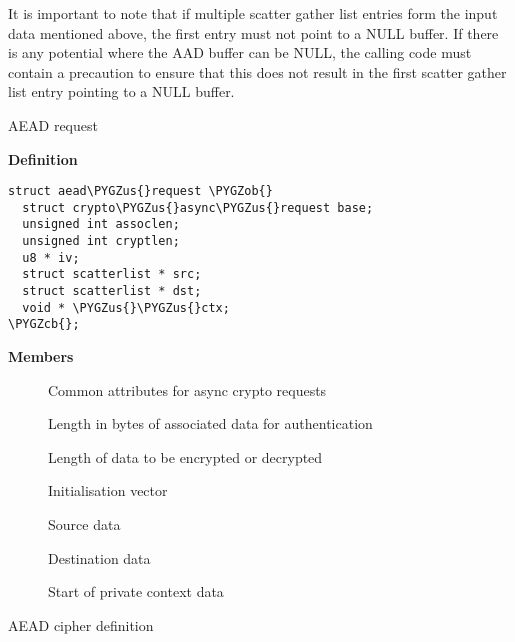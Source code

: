 \documentclass[a4paper,8pt,english]{sphinxmanual}
\def\PYGZus{\char`\_}
\def\PYGZob{\char`\{}
\def\PYGZcb{\char`\}}
\begin{document}
It is important to note that if multiple scatter gather list entries form
the input data mentioned above, the first entry must not point to a NULL
buffer. If there is any potential where the AAD buffer can be NULL, the
calling code must contain a precaution to ensure that this does not result
in the first scatter gather list entry pointing to a NULL buffer.

\begin{fulllineitems}
\label{crypto/api-aead:c.aead_request}
AEAD request

\end{fulllineitems}


\textbf{Definition}

\begin{Verbatim}[commandchars=\\\{\}]
struct aead\PYGZus{}request \PYGZob{}
  struct crypto\PYGZus{}async\PYGZus{}request base;
  unsigned int assoclen;
  unsigned int cryptlen;
  u8 * iv;
  struct scatterlist * src;
  struct scatterlist * dst;
  void * \PYGZus{}\PYGZus{}ctx;
\PYGZcb{};
\end{Verbatim}

\textbf{Members}
\begin{description}
\item[{}] \leavevmode
Common attributes for async crypto requests

\item[{}] \leavevmode
Length in bytes of associated data for authentication

\item[{}] \leavevmode
Length of data to be encrypted or decrypted

\item[{}] \leavevmode
Initialisation vector

\item[{}] \leavevmode
Source data

\item[{}] \leavevmode
Destination data

\item[{}] \leavevmode
Start of private context data

\end{description}

\begin{fulllineitems}
\label{crypto/api-aead:c.aead_alg}
AEAD cipher definition

\end{fulllineitems}
\end{document}
